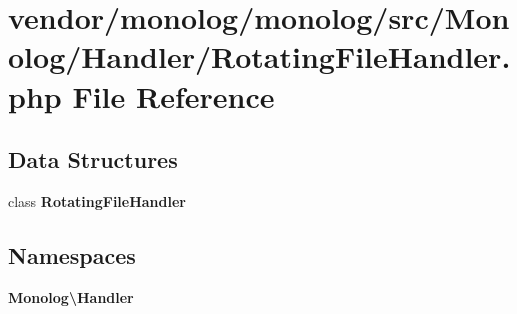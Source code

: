 \section{vendor/monolog/monolog/src/\+Monolog/\+Handler/\+Rotating\+File\+Handler.php File Reference}
\label{_rotating_file_handler_8php}
\subsection*{Data Structures}
\begin{DoxyCompactItemize}
\item 
class {\bf Rotating\+File\+Handler}
\end{DoxyCompactItemize}
\subsection*{Namespaces}
\begin{DoxyCompactItemize}
\item 
 {\bf Monolog\textbackslash{}\+Handler}
\end{DoxyCompactItemize}
